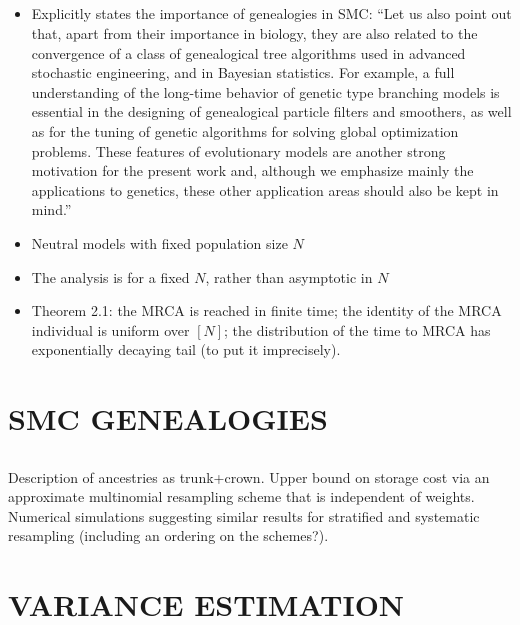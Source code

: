 \documentclass{article}
\begin{document}
\subsection*{\cite{delmoral2009}}
\begin{itemize}
\item Explicitly states the importance of genealogies in SMC: ``Let us
also point out that, apart from their importance in biology, they are also related
to the convergence of a class of genealogical tree algorithms used in advanced
stochastic engineering, and in Bayesian statistics. For example, a full understanding
of the long-time behavior of genetic type branching models is essential in the
designing of genealogical particle filters and smoothers, as well as for the tuning
of genetic algorithms for solving global optimization problems. These features
of evolutionary models are another strong motivation for the present work and,
although we emphasize mainly the applications to genetics, these other application
areas should also be kept in mind.''
\item Neutral models with fixed population size $N$
\item The analysis is for a fixed $N$, rather than asymptotic in $N$
\item Theorem 2.1: the MRCA is reached in finite time; the identity of the MRCA individual is uniform over $[N]$; the distribution of the time to MRCA has exponentially decaying tail (to put it imprecisely).
\end{itemize}




\section*{SMC GENEALOGIES}

\subsection*{\cite{jacob2015}}
Description of ancestries as trunk+crown. Upper bound on storage cost via an approximate multinomial resampling scheme that is independent of weights. Numerical simulations suggesting similar results for stratified and systematic resampling (including an ordering on the schemes?). 

\subsection*{\cite{koskela2018}}


%
\section*{VARIANCE ESTIMATION}

\subsection*{\cite{chan2013}}


\subsection*{\cite{lee2018}}


\subsection*{\cite{olsson2019}}


%
\end{document}
